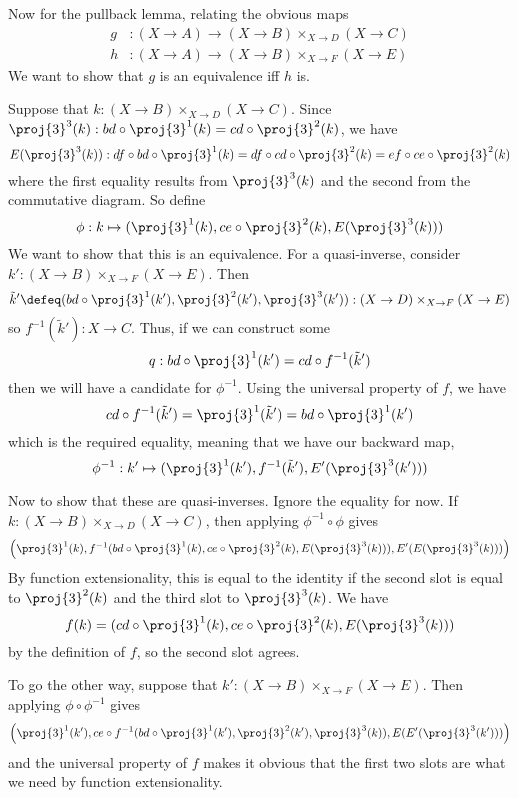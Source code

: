 Now for the pullback lemma, relating the obvious maps
\begin{align*}
  g &: (X \to A) \to (X \to B) \times_{X \to D} (X \to C) \\
  h &: (X \to A) \to (X \to B) \times_{X \to F} (X \to E)
\end{align*}
We want to show that $g$ is an equivalence iff $h$ is.


Suppose that $k : (X \to B) \times_{X \to D} (X \to C)$.  Since
$\proj{3}^{3}(k) : bd \circ \proj{3}^{1}(k) = cd \circ \proj{3}^{2}(k)$, we
have
\[
  E(\proj{3}^{3}(k))
  :
  df \circ bd \circ \proj{3}^{1}(k) 
  = df \circ cd \circ \proj{3}^{2}(k)
  = ef \circ ce \circ \proj{3}^{2}(k)
\]
where the first equality results from $\proj{3}^{3}(k)$ and the second from the
commutative diagram.  So define
\[
  \phi : k \mapsto (\proj{3}^{1}(k), ce \circ \proj{3}^{2}(k),
  E(\proj{3}^{3}(k)))
\]
We want to show that this is an equivalence.  For a quasi-inverse, consider
$k' : (X \to B) \times_{X \to F} (X \to E)$.  Then 
\[
    \tilde{k}'
    \defeq
    (bd \circ \proj{3}^{1}(k'), \proj{3}^{2}(k'), \proj{3}^{3}(k'))
    :
    (X \to D) \times_{X \to F} (X \to E)
\]
so $f^{-1}(\tilde{k}') : X \to C$.  Thus, if we can construct some
\[
  q : bd \circ \proj{3}^{1}(k') = cd \circ f^{-1}(\tilde{k}')
\]
then we will have a candidate for $\phi^{-1}$.  Using the universal property of
$f$, we have
\[
  cd \circ f^{-1}(\tilde{k}')
  = \proj{3}^{1}(\tilde{k}')
  = bd \circ \proj{3}^{1}(k')
\]
which is the required equality, meaning that we have our backward map,
\[
  \phi^{-1} : k' \mapsto (\proj{3}^{1}(k'), f^{-1}(\tilde{k}'), E'(\proj{3}^{3}(k')))
\]


Now to show that these are quasi-inverses.  Ignore the equality for now.
If $k : (X \to B) \times_{X\to D} (X \to C)$, then applying $\phi^{-1} \circ
\phi$ gives
\[
  \left(
    \proj{3}^{1}(k),
    f^{-1}(bd \circ \proj{3}^{1}(k),
           ce \circ \proj{3}^{2}(k),
           E(\proj{3}^{3}(k))),
    E'(E(\proj{3}^{3}(k)))
  \right)
\]
By function extensionality, this is equal to the identity if the second slot is
equal to $\proj{3}^{2}(k)$ and the third slot to $\proj{3}^{3}(k)$.  We have
\[
  f(k) = (cd \circ \proj{3}^{1}(k), ce \circ \proj{3}^{2}(k), E(\proj{3}^{3}(k)))
\]
by the definition of $f$, so the second slot agrees.


To go the other way, suppose that $k' : (X \to B) \times_{X\to F} (X \to E)$.
Then applying $\phi \circ \phi^{-1}$ gives
\[
  \left(
    \proj{3}^{1}(k'),
    ce \circ f^{-1}(bd \circ \proj{3}^{1}(k'), \proj{3}^{2}(k'), \proj{3}^{3}(k)),
    E(E'(\proj{3}^{3}(k')))
  \right)
\]
and the universal property of $f$ makes it obvious that the first two slots are
what we need by function extensionality.


